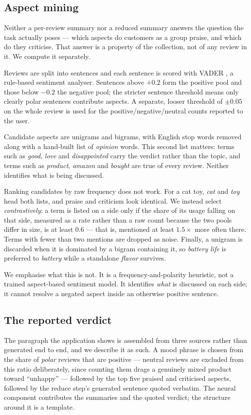 \subsection{Aspect mining}

Neither a per-review summary nor a reduced summary answers the question the
task actually poses --- which aspects do customers as a group praise, and which
do they criticise. That answer is a property of the collection, not of any
review in it. We compute it separately.

Reviews are split into sentences and each sentence is scored with VADER
\cite{hutto2014vader}, a rule-based sentiment analyser. Sentences above $+0.2$
form the positive pool and those below $-0.2$ the negative pool; the stricter
sentence threshold means only clearly polar sentences contribute aspects. A
separate, looser threshold of $\pm0.05$ on the whole review is used for the
positive/negative/neutral counts reported to the user.

Candidate aspects are unigrams and bigrams, with English stop words removed
along with a hand-built list of \emph{opinion} words. This second list matters:
terms such as \emph{good}, \emph{love} and \emph{disappointed} carry the
verdict rather than the topic, and terms such as \emph{product},
\emph{amazon} and \emph{bought} are true of every review. Neither identifies
what is being discussed.

Ranking candidates by raw frequency does not work. For a cat toy, \emph{cat}
and \emph{toy} head both lists, and praise and criticism look identical. We
instead select \emph{contrastively}: a term is listed on a side only if the
share of its usage falling on that side, measured as a rate rather than a raw
count because the two pools differ in size, is at least $0.6$ --- that is,
mentioned at least $1.5\times$ more often there. Terms with fewer than two
mentions are dropped as noise. Finally, a unigram is discarded when it is
dominated by a bigram containing it, so \emph{battery life} is preferred to
\emph{battery} while a standalone \emph{flavor} survives.

We emphasise what this is not. It is a frequency-and-polarity heuristic, not a
trained aspect-based sentiment model. It identifies \emph{what} is discussed on
each side; it cannot resolve a negated aspect inside an otherwise positive
sentence.

\subsection{The reported verdict}

The paragraph the application shows is assembled from three sources rather
than generated end to end, and we describe it as such. A mood phrase is chosen
from the share of \emph{polar} reviews that are positive --- neutral reviews
are excluded from this ratio deliberately, since counting them drags a
genuinely mixed product toward ``unhappy'' --- followed by the top five
praised and criticised aspects, followed by the reduce step's generated
sentence quoted verbatim. The neural component contributes the summaries and
the quoted verdict; the structure around it is a template.
